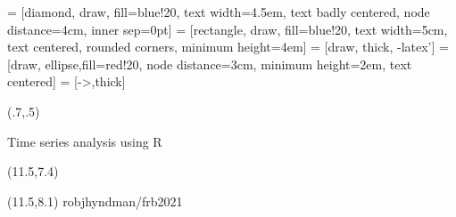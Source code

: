 
\usepackage{bm,booktabs,animate,ragged2e,multicol,microtype,hyperref,alltt}

\fontsize{13}{15}\sf
\usepackage[scale=0.85]{sourcecodepro}
\usepackage{fontawesome}

\usetikzlibrary{trees,shapes,arrows,matrix}
 = [diamond, draw, fill=blue!20,
    text width=4.5em, text badly centered, node distance=4cm, inner sep=0pt]
 = [rectangle, draw, fill=blue!20,
    text width=5cm, text centered, rounded corners, minimum height=4em]
 = [draw, thick, -latex']
 = [draw, ellipse,fill=red!20, node distance=3cm,
    minimum height=2em, text centered]
 = [->,thick]

\graphicspath{{figs/}}

{
\begin{textblock}{7.5}(.7,.5)\fontsize{24}{26}\sf
{\color{MonashBlue}\raggedright{}\par Time series analysis using R}
\end{textblock}
\begin{textblock}{7.5}(11.5,7.4)
{\fontsize{15}{15}\sf\color[RGB]{45,27,15}\bfseries\raggedright{\insertauthor}}
\end{textblock}
\begin{textblock}{7.5}(11.5,8.1)
{\fontsize{9}{9}\sf\color[RGB]{45,27,15}robjhyndman/frb2021}
\end{textblock}
}

\def\E{\text{E}}
\def\V{\text{Var}}
\def\bY{\bm{y}}
\def\by{\bm{y}}
\def\bS{\bm{S}}
\def\bG{\bm{G}}
\def\bW{\bm{W}}
\def\bSigma{\bm{\Sigma}}
\def\Var{\text{Var}}
\def\var{\text{Var}}
\newcommand{\btwocol}{\begin{multicols}{2}}
\newcommand{\etwocol}{\end{multicols}}
\def\pred#1#2#3{\hat{#1}_{#2|#3}}
\def\damped{$_\text{d}$}

\def\forecast{\begin{alertblock}{}\fontsize{10}{11}\sf
A forecast is an estimate of the probability distribution of a variable to be observed in the future.
\end{alertblock}}
\def\simfutures{\begin{textblock}{2.7}(13,7.7)
\begin{block}{}\fontsize{10}{11}\sf
Simulated futures from an ETS model
\end{block}\end{textblock}}
